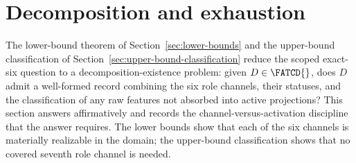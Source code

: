\section{Decomposition and exhaustion}\label{sec:decomposition-exhaustion}

%
%


The lower-bound theorem of Section~\ref{sec:lower-bounds} and the
upper-bound classification of
Section~\ref{sec:upper-bound-classification} reduce the scoped
exact-six question to a decomposition-existence problem: given
\(D \in \FATCD{}\), does \(D\) admit a well-formed record combining
the six role channels, their statuses, and the classification of any
raw features not absorbed into active projections? This section
answers affirmatively and records the channel-versus-activation
discipline that the answer requires. The lower bounds show that each
of the six channels is materially realizable in the domain; the
upper-bound classification shows that no covered seventh role channel
is needed.

